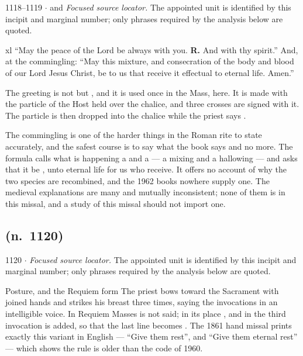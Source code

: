 \begin{appointed}{1118--1119 $\cdot$  and }
\textit{Focused source locator.} The appointed unit is identified by this incipit and marginal number; only phrases required by the analysis below are quoted.
\end{appointed}

\begin{englishwitness}{xl}
``May the peace of the Lord be always with you. \textbf{R.} And with thy
spirit.'' And, at the commingling: ``May this mixture, and consecration of the
body and blood of our Lord Jesus Christ, be to us that receive it effectual to
eternal life. Amen.''
\end{englishwitness}

The greeting is not  but , and it is used once in the Mass, here. It is made with the
particle of the Host held over the chalice, and three crosses are signed with
it. The particle is then dropped into the chalice while the priest says
.

The commingling is one of the harder things in the Roman rite to state
accurately, and the safest course is to say what the book says and no more. The
formula calls what is happening a  and a
 --- a mixing and a hallowing --- and asks that it be
, unto eternal life for us who
receive. It offers no account of why the two species are recombined, and the
1962 books nowhere supply one. The medieval explanations are many and mutually
inconsistent; none of them is in this missal, and a study of this missal should
not import one.

\subsection*{ (n.~1120)}

\begin{appointed}{1120 $\cdot$ }
\textit{Focused source locator.} The appointed unit is identified by this incipit and marginal number; only phrases required by the analysis below are quoted.
\end{appointed}

\begin{rubricnote}{Posture, and the Requiem form}
The priest bows toward the Sacrament with joined hands and strikes his breast
three times, saying the invocations in an intelligible voice. In Requiem Masses
 is not said; in its place ,
and in the third invocation  is added, so that the last
line becomes . The 1861 hand missal
prints exactly this variant in English --- ``Give them rest'', and ``Give them
eternal rest'' --- which shows the rule is older than the code of 1960.
\end{rubricnote}

